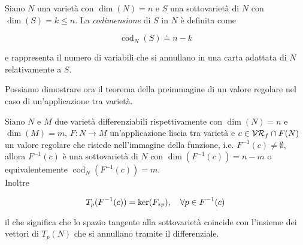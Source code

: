 \begin{definition}
	Siano $ N $ una varietà con $ \dim(N)=n $ e $ S $ una sottovarietà di $ N $ con $ \dim(S)=k \leqslant n $. La \textit{codimensione} di $ S $ in $ N $ è definita come
	
	\begin{equation}
		\operatorname{cod}_{N}(S) \doteq n-k
	\end{equation}

	e rappresenta il numero di variabili che si annullano in una carta adattata di $ N $ relativamente a $ S $.
\end{definition}

Possiamo dimostrare ora il teorema della preimmagine di un valore regolare nel caso di un'applicazione tra varietà.

\begin{theorem}\label{thm:preimg}
	Siano $ N $ e $ M $ due varietà differenziabili rispettivamente con $ \dim(N)=n $ e $ \dim(M)=m $, $ F : N \to M $ un'applicazione liscia tra varietà e $ c \in \mathcal{VR}_{f} \cap F(N) $ un valore regolare che risiede nell'immagine della funzione, i.e. $ F^{-1}(c) \neq \emptyset $, allora $ F^{-1}(c) $ è una sottovarietà di $ N $ con $ \dim(F^{-1}(c)) = n-m $ o equivalentemente $ \operatorname{cod}_{N}(F^{-1}(c)) = m $.\\
	Inoltre
	
	\begin{equation}
		T_{p}(F^{-1}(c)) = \ker(F_{*p}) \qcomma \forall p \in F^{-1}(c)
	\end{equation} 

	il che significa che lo spazio tangente alla sottovarietà coincide con l'insieme dei vettori di $ T_{p}(N) $ che si annullano tramite il differenziale.
\end{theorem}

